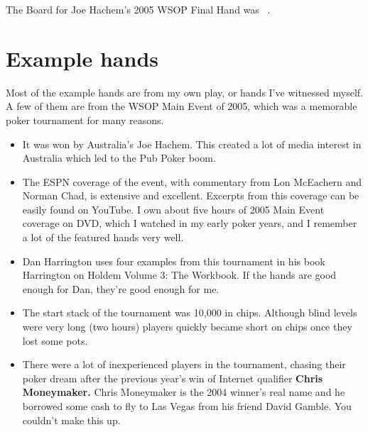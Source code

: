 The Board for Joe Hachem's 2005 WSOP Final Hand was
\sixh\fived\fourd\As\fourc\ .

\section*{Example hands}

Most of the example hands are from my own play, or hands I've
witnessed myself. A few of them are from the WSOP Main Event
of 2005, which was a memorable poker tournament for many reasons.

\begin{itemize}
  \item It was won by Australia's Joe Hachem. This created a lot of
    media interest in Australia which led to the Pub Poker boom.
  \item The ESPN coverage of the event, with commentary from
    Lon McEachern and Norman Chad, is extensive and
    excellent. Excerpts from this coverage can be easily found on
    YouTube. I own about five hours of 2005 Main Event coverage on
    DVD, which I watched in my early poker years, and I remember a lot
    of the featured hands very well.
  \item Dan Harrington uses four examples from this tournament in his
    book Harrington on Holdem Volume 3: The Workbook. If the hands are
    good enough for Dan, they're good enough for me.
  \item The start stack of the tournament was 10,000 in
    chips. Although blind levels were very long (two hours)
    players quickly became short on chips once they lost some pots.
  \item There were a lot of inexperienced players in the tournament,
    chasing their poker dream after the previous year's win of
    Internet qualifier \textbf{Chris Moneymaker.} Chris Moneymaker is
    the 2004 winner's real name and he borrowed some cash to fly to
    Las Vegas from his friend David Gamble. You couldn't make this up.

\end{itemize}


